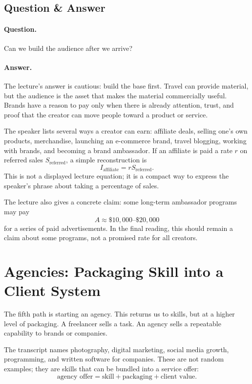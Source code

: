 \subsection{Question \& Answer}

\paragraph{Question.}
Can we build the audience after we arrive?

\paragraph{Answer.}
The lecture's answer is cautious: build the base first. Travel can provide material, but the audience is the asset that makes the material commercially useful. Brands have a reason to pay only when there is already attention, trust, and proof that the creator can move people toward a product or service.

The speaker lists several ways a creator can earn: affiliate deals, selling one's own products, merchandise, launching an e-commerce brand, travel blogging, working with brands, and becoming a brand ambassador. If an affiliate is paid a rate \(r\) on referred sales \(S_{\mathrm{referred}}\), a simple reconstruction is
\begin{equation}
I_{\mathrm{affiliate}}=rS_{\mathrm{referred}}.
\end{equation}
This is not a displayed lecture equation; it is a compact way to express the speaker's phrase about taking a percentage of sales.

The lecture also gives a concrete claim: some long-term ambassador programs may pay
\begin{equation}
A \approx \$10{,}000\text{--}\$20{,}000
\end{equation}
for a series of paid advertisements. In the final reading, this should remain a claim about some programs, not a promised rate for all creators.

\section{Agencies: Packaging Skill into a Client System}

The fifth path is starting an agency. This returns us to skills, but at a higher level of packaging. A freelancer sells a task. An agency sells a repeatable capability to brands or companies.

The transcript names photography, digital marketing, social media growth, programming, and written software for companies. These are not random examples; they are skills that can be bundled into a service offer:
\begin{equation}
\text{agency offer}
=
\text{skill}
+
\text{packaging}
+
\text{client value}.
\end{equation}

